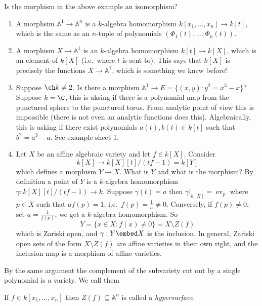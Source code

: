 \documentclass[a4paper]{article}
\renewcommand{\A}{\mathbb{A}}
\DeclareMathOperator{\ev}{ev}
\begin{document}
\begin{question}
  Is the morphism in the above example an isomorphism?
\end{question}

\begin{eg}\leavevmode
  \begin{enumerate}
  \item A morphsim \(\A^1 \to \A^n\) is a \(k\)-algebra homomorphism \(k[x_1, \dots, x_n] \to k[t]\), which is the same as an \(n\)-tuple of polynomials \((\Phi_1(t), \dots, \Phi_n(t))\).
  \item A morphism \(X \to \A^1\) is an \(k\)-algebra homomorphism \(k[t] \to k[X]\), which is an element of \(k[X]\) (i.e.\ where \(t\) is sent to). This says that \(k[X]\) is precisely the functions \(X \to \A^1\), which is something we knew before!
  \item Suppose \(\ch k \neq 2\). Is there a morphism \(\A^1 \to E = \{(x, y): y^2 = x^3 - x\}\)? Suppose \(k = \C\), this is aksing if there is a polynomial map from the punctured sphere to the punctured torus. From analytic point of view this is impossible (there is not even an analytic functions does this). Algebraically, this is asking if there exist polynomials \(a(t), b(t) \in k[t]\) such that \(b^2 = a^3 - a\). See example sheet 1.
  \item Let \(X\) be an affine algebraic variety and let \(f \in k[X]\). Consider
    \[
      k[X] \to k[X][t]/(tf - 1) = k[Y]
    \]
    which defines a morphism \(Y \to X\). What is \(Y\) and what is the morphism? By definition a point of \(Y\) is a \(k\)-algebra homomorphism \(\gamma: k[X][t]/(tf - 1) \to k\). Suppose \(\gamma(t) = a\) then \(\gamma|_{k[X]} = \ev_p\) where \(p \in X\) such that \(a f(p) = 1\), i.e.\ \(f(p) = \frac{1}{a} \neq 0\). Conversely, if \(f(p) \neq 0\), set \(a = \frac{1}{f(p)}\), we get a \(k\)-algebra homomorphism. So
    \[
      Y = \{x \in X: f(x) \neq 0\} = X \setminus Z(f)
    \]
    which is Zariski open, and \(\gamma: Y \embed X\) is the inclusion. In general, Zariski open sets of the form \(X \setminus Z(f)\) are affine varieties in their own right, and the inclusion map is a morphism of affine varieties.
  \end{enumerate}
\end{eg}

By the same argument the complement of the subvariety cut out by a single polynomial is a variety. We call them

\begin{definition}[hypersurface]
  If \(f \in k[x_1, \dots, x_n]\) then \(Z(f) \subseteq \A^n\) is called a \emph{hypersurface}.
\end{definition}
\end{document}
